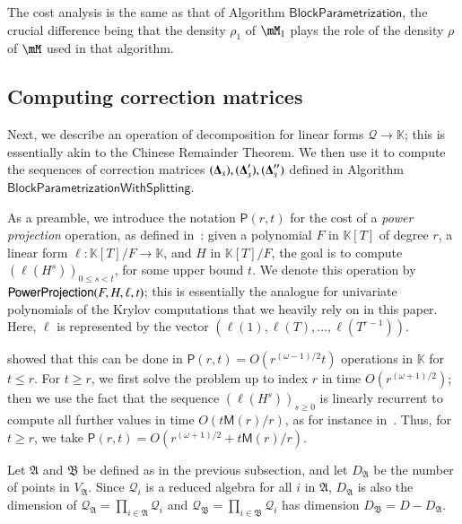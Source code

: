 \documentclass[final,1p,times,authoryear]{elsarticle}
\newcommand{\mat}[1]{\bm{\MakeUppercase{#1}}} %
\newcommand{\mainalgoname}{\mathsf{ BlockParametrization}}
\newcommand{\residueI}{\mathscr{Q}}
\def\M {\ensuremath{\mathsf{M}}}
\def\PP {\ensuremath{\mathsf{P}}}
\def\K{\mathbb{K}}
\def\K {\ensuremath{\mathbb{K}}}
\begin{document}
The cost analysis is the same as that of Algorithm $\mainalgoname$, the
crucial difference being that the density $\rho_1$ of $\mM_1$ plays the 
role of the density $\rho$ of $\mM$ used in that algorithm.


\subsection{Computing correction matrices}

Next, we describe an operation of decomposition for linear forms
$\residueI \to \K$; this is essentially akin to the Chinese Remainder
Theorem. We then use it to compute the sequences of correction
matrices $(\mat{\Delta}_s),(\mat{\Delta}'_s),(\mat{\Delta}''_s)$
defined in Algorithm $\mathsf{BlockParametrizationWithSplitting}$.

As a preamble, we introduce the notation $\PP(r,t)$ for the cost of a
{\em power projection} operation, as defined
in~\citep{Shoup94,Shoup99}: given a polynomial $F$ in $\K[T]$ of degree
$r$, a linear form $\ell: \K[T]/F \to \K$, and $H$ in $\K[T]/F$, the
goal is to compute $(\ell(H^s))_{0 \le s < t}$, for some upper bound
$t$. We denote this operation by ${\sf PowerProjection}(F,H,\ell,t)$; this is
essentially the analogue for univariate polynomials of the Krylov
computations that we heavily rely on in this paper. Here, $\ell$ 
is represented by the vector $(\ell(1),\ell(T),\dots,\ell(T^{r-1}))$.

\citet[Theorem~4]{Shoup94} showed that this can be done in
$\PP(r,t)=O(r^{(\omega-1)/2} t)$ operations in $\K$ for $t \le r$. For
$t \ge r$, we first solve the problem up to index $r$ in time
$O(r^{(\omega+1)/2})$; then we use the fact that the sequence 
$(\ell(H^s))_{s \ge 0}$
is linearly recurrent to compute all further values in time
$O(t\M(r)/r)$, as for instance in~\citep[Proposition~1]{BoFlSaSc06}.
Thus, for $t \ge r$, we take $\PP(r,t)=O(r^{(\omega+1)/2} +
t\M(r)/r)$.

\medskip

Let $\mathfrak{A}$ and $\mathfrak{B}$ be defined as in the previous 
subsection, and let $D_{\mathfrak{A}}$ be the number of points in
$V_{\mathfrak{A}}$. Since $\residueI_i$ is a reduced algebra for all
$i$ in $\mathfrak{A}$, $D_\mathfrak{A}$ is also the dimension of
$\residueI_\mathfrak{A} = \prod_{i \in \mathfrak{A}}
\residueI_i$ and $\residueI_\mathfrak{B}=\prod_{i \in \mathfrak{B}}
\residueI_i$ has dimension $D_{\mathfrak{B}}=D-D_{\mathfrak{A}}$.
\end{document}
